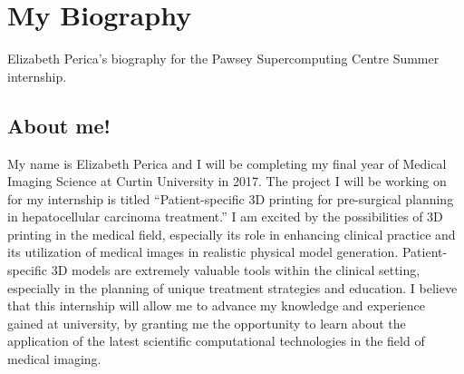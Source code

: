 \section{My Biography}
Elizabeth Perica's biography for the Pawsey Supercomputing Centre Summer internship.
\subsection{About me!}
My name is Elizabeth Perica and I will be completing my final year of Medical Imaging Science at 
Curtin University in 2017. The project I will be working on for my internship is titled 
“Patient-specific 3D printing for pre-surgical planning in hepatocellular carcinoma treatment.” 
I am excited by the possibilities of 3D printing in the medical field, especially its role in 
enhancing clinical practice and its utilization of medical images in realistic physical model 
generation. Patient-specific 3D models are extremely valuable tools within the clinical setting, 
especially in the planning of unique treatment strategies and education. I believe that this 
internship will allow me to advance my knowledge and experience gained at university, by granting 
me the opportunity to learn about the application of the latest scientific computational 
technologies in the field of medical imaging.
